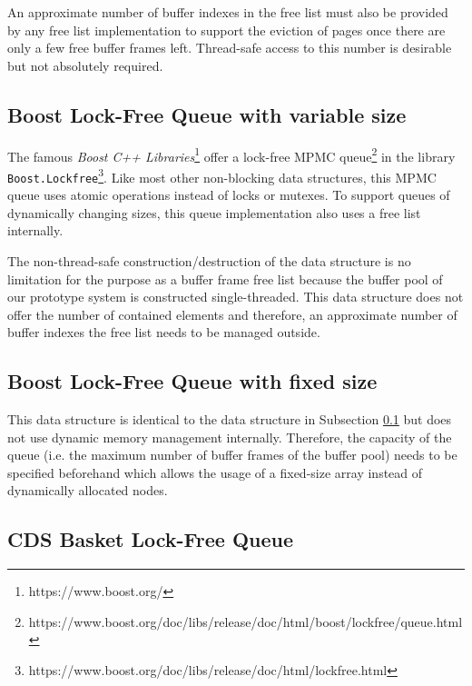 	An approximate number of buffer indexes in the free list must also be provided by any free list implementation to support the eviction of pages once there are only a few free buffer frames left. Thread-safe access to this number is desirable but not absolutely required.

\subsection[Boost Lock-Free Queue with variable size]{Boost Lock-Free Queue with variable size} \label{subsec:boost}

	The famous \textit{Boost C++ Libraries}\footnote{https://www.boost.org/} offer a lock-free MPMC queue\footnote{https://www.boost.org/doc/libs/release/doc/html/boost/lockfree/queue.html} in the library \lstinline{Boost.Lockfree}\footnote{https://www.boost.org/doc/libs/release/doc/html/lockfree.html}. Like most other non-blocking data structures, this MPMC queue uses atomic operations instead of locks or mutexes. To support queues of dynamically changing sizes, this queue implementation also uses a free list internally.
	
	The non-thread-safe construction/destruction of the data structure is no limitation for the purpose as a buffer frame free list because the buffer pool of our prototype system is constructed single-threaded. This data structure does not offer the number of contained elements and therefore, an approximate number of buffer indexes the free list needs to be managed outside.

\subsection[Boost Lock-Free Queue with fixed size]{Boost Lock-Free Queue with fixed size} \label{subsec:boost-fixed}

	This data structure is identical to the data structure in Subsection \ref{subsec:boost} but does not use dynamic memory management internally. Therefore, the capacity of the queue (i.e. the maximum number of buffer frames of the buffer pool) needs to be specified beforehand which allows the usage of a fixed-size array instead of dynamically allocated nodes.

\subsection[CDS BasketQueue]{CDS Basket Lock-Free Queue} \label{subsec:cds-basket}

